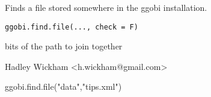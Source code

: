 \documentclass{article}
\begin{document}
\begin{Description}\relax
Finds a file stored somewhere in the ggobi installation.
\end{Description}
\begin{Usage}
\begin{verbatim}ggobi.find.file(..., check = F)\end{verbatim}
\end{Usage}
\begin{Arguments}
\begin{ldescription}
\item[\code{...}] bits of the path to join together
\item[\code{check}] 
\end{ldescription}
\end{Arguments}
\begin{Details}\relax
\end{Details}
\begin{Author}\relax
Hadley Wickham <h.wickham@gmail.com>
\end{Author}
\begin{Examples}
\begin{ExampleCode}ggobi.find.file("data","tips.xml")\end{ExampleCode}
\end{Examples}
\end{document}
